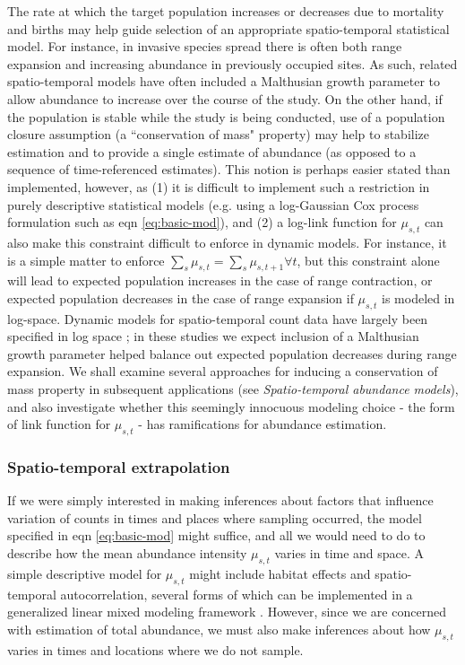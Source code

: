 \documentclass[times,mee,doublespace,]{besauth2}
\begin{document}
The rate at which the target population increases or decreases due to mortality and births may help guide selection
of an appropriate spatio-temporal statistical model.  For instance, in invasive species spread there is often both range expansion and increasing abundance in previously occupied sites.  As such, related spatio-temporal models have often included a Malthusian growth parameter \citep[e.g.][]{Wikle2003,HootenWikle2008} to allow abundance to increase over the course of the study.  On the other hand, if the population is stable while the study is being conducted, use of a population closure assumption (a ``conservation of mass" property) may help to stabilize estimation and to provide a single estimate of abundance (as opposed to a sequence of time-referenced estimates).  This notion is perhaps easier stated than implemented, however, as (1) it is difficult to implement such a restriction in purely descriptive statistical models (e.g. using a log-Gaussian Cox process formulation such as eqn \ref{eq:basic-mod}), and (2) a log-link function for $\mu_{s,t}$ can also make this constraint difficult to enforce in dynamic models.  For instance, it is a simple matter to enforce $\sum_s \mu_{s,t} = \sum_s \mu_{s,t+1} \forall t$, but this constraint alone will lead to expected population increases in the case of range contraction, or expected population decreases in the case of range expansion if $\mu_{s,t}$ is modeled in log-space.  Dynamic models for spatio-temporal count data have largely been specified in log space \citep[e.g.][]{Wikle2003,HootenWikle2008}; in these studies we expect inclusion of a Malthusian growth parameter helped balance out expected population decreases during range expansion.
We shall examine several approaches for inducing a conservation of mass property in subsequent applications (see {\it Spatio-temporal abundance models}), and also investigate whether this seemingly innocuous modeling choice - the form of link function for $\mu_{s,t}$ - has ramifications for abundance estimation.

\subsubsection{Spatio-temporal extrapolation}

If we were simply interested in making inferences about factors that influence variation of counts in times and places where sampling occurred, the model specified in eqn \ref{eq:basic-mod} might suffice, and all we would need to do to describe how the mean abundance intensity $\mu_{s,t}$ varies in time and space.  A simple descriptive model for $\mu_{s,t}$ might include habitat effects and spatio-temporal autocorrelation, several forms of which can be implemented in a generalized linear mixed modeling framework \citep[see e.g.][]{RossEtAl2012}.  However, since we are concerned with estimation of total abundance, we must also make inferences about how $\mu_{s,t}$ varies in times and locations where we do not sample.
\end{document}
